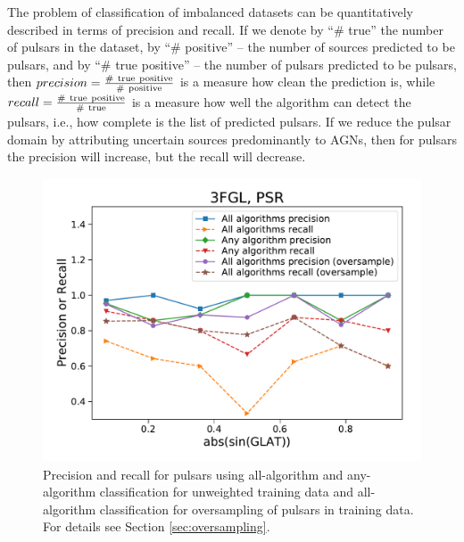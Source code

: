 The problem of classification of imbalanced datasets can be quantitatively described in terms of precision and recall.
If we denote by ``\# true'' the number of pulsars in the dataset, by ``\# positive'' -- the number of sources predicted to be pulsars, and by 
``\# true positive'' -- the number of pulsars predicted to be pulsars, then  $precision \rm = \frac{\#\ true\ positive}{\#\ positive}$ is a measure how clean the prediction is, while $recall \rm = \frac{\#\ true\ positive}{\#\ true}$ is a measure how well the algorithm can detect the pulsars, i.e., how complete is the list of predicted pulsars.
If we reduce the pulsar domain by attributing uncertain sources predominantly to AGNs, then for pulsars the precision will increase, but the recall will decrease.



\begin{figure}[h]
\includegraphics[width=\twopicsp\textwidth]{plots/all_algs_3FGL_precision_recall_oversample_PSR.pdf}
\caption{Precision and recall for pulsars using all-algorithm and any-algorithm classification for unweighted training data and
all-algorithm classification for oversampling of pulsars in training data. For details see Section \ref{sec:oversampling}.}
\label{fig:prec_recall}
\end{figure}



